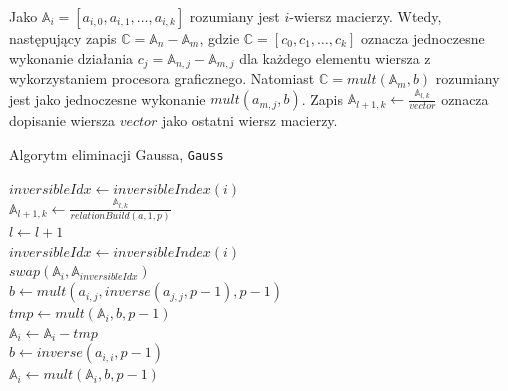 \documentclass[]{article}
\begin{document}
		Jako \(\mathbb{A}_i = [a_{i,0}, a_{i,1}, \dots, a_{i,k}]\) rozumiany jest \(i\)-wiersz macierzy. Wtedy, następujący zapis \(\mathbb{C} = \mathbb{A}_n - \mathbb{A}_m\), gdzie \(\mathbb{C} = [c_0, c_1, \dots, c_k]\) oznacza jednoczesne wykonanie działania \(c_j = \mathbb{A}_{n,j} - \mathbb{A}_{m,j}\) dla każdego elementu wiersza z wykorzystaniem procesora graficznego. Natomiast \(\mathbb{C} = mult(\mathbb{A}_m, b)\) rozumiany jest jako jednoczesne wykonanie \(mult(a_{m,j}, b)\). Zapis \(\mathbb{A}_{l+1, k} \gets \frac{\mathbb{A}_{l, k}}{vector}\) oznacza dopisanie wiersza \(vector\) jako ostatni wiersz macierzy. 
		\newline
		\begin{algorithm}[H]
			\SetAlgoLined
			\label{Gauss}
			\caption{Algorytm eliminacji Gaussa, \texttt{Gauss}}
			
			{
				{
					{
						\(inversibleIdx \gets inversibleIndex(i)\) \\
						{
							\(\mathbb{A}_{l+1, k} \gets \frac{\mathbb{A}_{l, k}}{relationBuild(a, 1, p)} \)\\
							\(l \gets l + 1\) \\
							\(inversibleIdx \gets inversibleIndex(i)\) \\
							\(swap(\mathbb{A}_i, \mathbb{A}_{inversibleIdx})\) \\
						}
						\(b \gets mult(a_{i,j}, inverse(a_{j,j}, p-1), p-1)\) \\
						\(tmp \gets mult(\mathbb{A}_i, b, p-1)\) \\
						\(\mathbb{A}_i \gets \mathbb{A}_i - tmp\) \\
					}
				}
			}
			{
				\(b \gets inverse(a_{i,i}, p-1)\) \\
				\(\mathbb{A}_i \gets mult(\mathbb{A}_i, b, p-1)\) \\
			}
			
		\end{algorithm}
		
\end{document}
